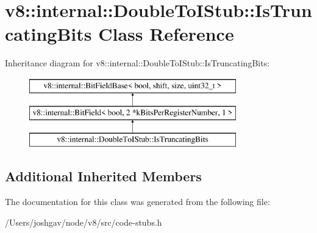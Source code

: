 \hypertarget{classv8_1_1internal_1_1_double_to_i_stub_1_1_is_truncating_bits}{}\section{v8\+:\+:internal\+:\+:Double\+To\+I\+Stub\+:\+:Is\+Truncating\+Bits Class Reference}
\label{classv8_1_1internal_1_1_double_to_i_stub_1_1_is_truncating_bits}
Inheritance diagram for v8\+:\+:internal\+:\+:Double\+To\+I\+Stub\+:\+:Is\+Truncating\+Bits\+:\begin{figure}[H]
\begin{center}
\leavevmode
\includegraphics[height=3.000000cm]{classv8_1_1internal_1_1_double_to_i_stub_1_1_is_truncating_bits}
\end{center}
\end{figure}
\subsection*{Additional Inherited Members}


The documentation for this class was generated from the following file\+:\begin{DoxyCompactItemize}
\item 
/\+Users/joshgav/node/v8/src/code-\/stubs.\+h\end{DoxyCompactItemize}

